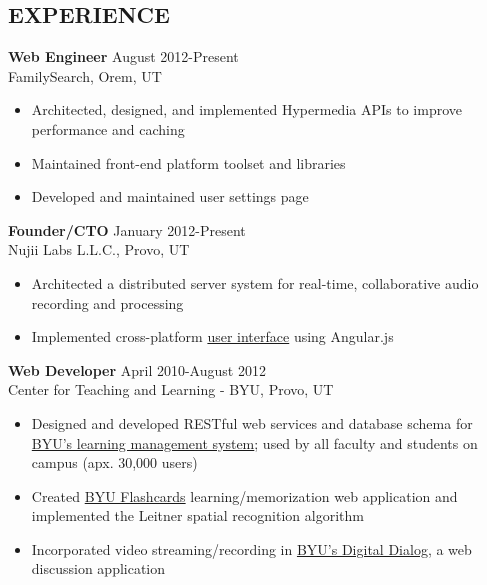 \documentclass[margin]{res}
\begin{document}

  \address{\bf  10956 S Hyrum Pl\\Sandy, UT 84070\\(801) 803-8577}
  \address{bytheway.cameron@gmail.com\\
           LinkedIn: \href{http://www.linkedin.com/pub/cameron-bytheway/36/a68/993}{Cameron Bytheway}\\
           Github: \href{http://github.com/CamShaft}{CamShaft}}

  \begin{resume}

    \section{EXPERIENCE}

      {\bf Web Engineer} \hfill August 2012-Present \\
      FamilySearch, Orem, UT 
      \begin{itemize} \itemsep -2pt
        \item Architected, designed, and implemented Hypermedia APIs to improve performance and caching
        \item Maintained front-end platform toolset and libraries
        \item Developed and maintained user settings page
      \end{itemize}

      {\bf Founder/CTO} \hfill January 2012-Present \\
      Nujii Labs L.L.C., Provo, UT 
      \begin{itemize} \itemsep -2pt
        \item Architected a distributed server system for real-time, collaborative audio recording and processing
        \item Implemented cross-platform 
        \href{https://github.com/nujii/nujiistudio.js}{user interface} using Angular.js
      \end{itemize}

      {\bf Web Developer} \hfill April 2010-August 2012 \\
      Center for Teaching and Learning - BYU, Provo, UT
      \begin{itemize} \itemsep -2pt
        \item Designed and developed RESTful web services and database
         schema for \href{http://lsinfo.byu.edu/}{BYU's learning management system};
         used by all faculty and students on campus (apx. 30,000 users)
        \item Created 
        \href{http://ctl.byu.edu/tools/byu-flashcards}{BYU Flashcards}
        learning/memorization web application and implemented the Leitner
        spatial recognition algorithm
        \item Incorporated video streaming/recording in
        \href{http://ctl.byu.edu/tools/byu-digital-dialog}{BYU's Digital Dialog},
        a web discussion application
      \end{itemize}


\end{resume}
\end{document}
